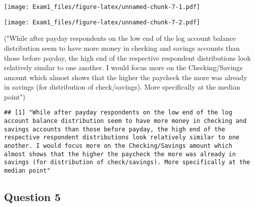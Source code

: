 \documentclass[
]{article}
\newenvironment{Shaded}{\begin{snugshade}}{\end{snugshade}}
\newcommand{\DataTypeTok}[1]{\textcolor[rgb]{0.13,0.29,0.53}{#1}}
\newcommand{\DecValTok}[1]{\textcolor[rgb]{0.00,0.00,0.81}{#1}}
\newcommand{\KeywordTok}[1]{\textcolor[rgb]{0.13,0.29,0.53}{\textbf{#1}}}
\newcommand{\NormalTok}[1]{#1}
\newcommand{\OperatorTok}[1]{\textcolor[rgb]{0.81,0.36,0.00}{\textbf{#1}}}
\newcommand{\StringTok}[1]{\textcolor[rgb]{0.31,0.60,0.02}{#1}}
\begin{document}
\texttt{[image: Exam1\_files/figure-latex/unnamed-chunk-7-1.pdf]}

\begin{Shaded}
\end{Shaded}

\texttt{[image: Exam1\_files/figure-latex/unnamed-chunk-7-2.pdf]}

\begin{Shaded}
\begin{Highlighting}[]
\NormalTok{(}\StringTok{"While after payday respondents on the low end of the log account balance distribution seem to have more money in checking and savings accounts than those before payday, the high end of the respective respondent distributions look relatively similar to one another. I would focus more on the Checking/Savings amount which almost shows that the higher the paycheck the more was already in savings (for distribution of check/savings). More specifically at the median point"}\NormalTok{)}
\end{Highlighting}
\end{Shaded}

\begin{verbatim}
## [1] "While after payday respondents on the low end of the log account balance distribution seem to have more money in checking and savings accounts than those before payday, the high end of the respective respondent distributions look relatively similar to one another. I would focus more on the Checking/Savings amount which almost shows that the higher the paycheck the more was already in savings (for distribution of check/savings). More specifically at the median point"
\end{verbatim}

\hypertarget{question-5}{%
\subsection{Question 5}\label{question-5}}
\end{document}
